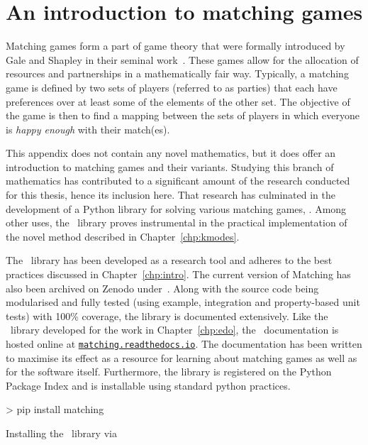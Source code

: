 \chapter{An introduction to matching games}
\label{app:matching}

\graphicspath{{appendix/matching/paper/img/}}

Matching games form a part of game theory that were formally introduced by Gale
and Shapley in their seminal work~\cite{Gale1962}. These games allow for the
allocation of resources and partnerships in a mathematically fair way.
Typically, a matching game is defined by two sets of players (referred to as parties)
that each have preferences over at least some of the elements of the other set.
The objective of the game is then to find a mapping between the sets of players
in which everyone is \emph{happy enough} with their match(es).

This appendix does not contain any novel mathematics, but it does offer an
introduction to matching games and their variants. Studying this branch of
mathematics has contributed to a significant amount of the research conducted
for this thesis, hence its inclusion here. That research has culminated in the
development of a Python library for solving various matching games, \matching.
Among other uses, the \matching\ library proves instrumental in the practical
implementation of the novel method described in Chapter~\ref{chp:kmodes}.

The \matching\ library has been developed as a research tool and adheres to the
best practices discussed in Chapter~\ref{chp:intro}. The current version of
Matching has also been archived on Zenodo under~.
Along with the source code being modularised and fully tested (using example,
integration and property-based unit tests) with 100\% coverage, the library is
documented extensively. Like the \edo\ library developed for the work in
Chapter~\ref{chp:edo}, the \matching\ documentation is hosted online at
\href{https://matching.readthedocs.io}{\nolinkurl{matching.readthedocs.io}}.
The documentation has been written to maximise its effect as a resource for
learning about matching games as well as for the software itself. Furthermore,
the library is registered on the Python Package Index and is installable using standard python practices.

\begin{listing}
\begin{usagesh}
> pip install matching
\end{usagesh}
\caption{Installing the \matching\ library via \pip}
\end{listing}

